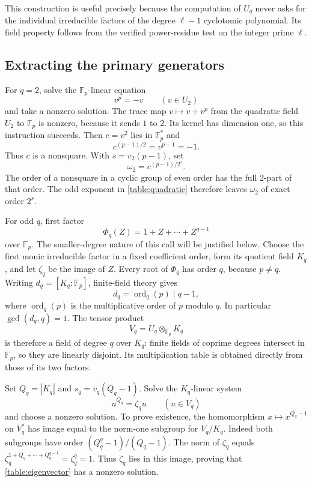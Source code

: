 This construction is useful precisely because the computation of
$U_q$ never asks for the individual irreducible factors of the degree
$\ell-1$ cyclotomic polynomial.  Its field property follows from the
verified power-residue test on the integer prime $\ell$.

\subsection{Extracting the primary generators}

For $q=2$, solve the $\mathbb F_p$-linear equation
\[
 v^p=-v\qquad(v\in U_2)
\]
and take a nonzero solution.  The trace map $v\mapsto v+v^p$ from the
quadratic field $U_2$ to $\mathbb F_p$ is nonzero, because it sends $1$
to $2$.  Its kernel has dimension one, so this instruction succeeds.
Then $c=v^2$ lies in $\mathbb F_p^*$ and
\[
 c^{(p-1)/2}=v^{p-1}=-1.
\]
Thus $c$ is a nonsquare.  With $s=v_2(p-1)$, set
\begin{equation}\label{table:quadratic}
 \omega_2=c^{(p-1)/2^s}.
\end{equation}
The order of a nonsquare in a cyclic group of even order has the full
$2$-part of that order.  The odd exponent in \eqref{table:quadratic}
therefore leaves $\omega_2$ of exact order $2^s$.

For odd $q$, first factor
\[
 \Phi_q(Z)=1+Z+\cdots+Z^{q-1}
\]
over $\mathbb F_p$.  The smaller-degree nature of this call will be
justified below.  Choose the first monic irreducible factor in a fixed
coefficient order, form its quotient field $K_q$, and let $\zeta_q$ be the
image of $Z$.  Every root of $\Phi_q$ has order $q$, because $p\ne q$.
Writing $d_q=[K_q:\mathbb F_p]$, finite-field theory gives
\[
 d_q=\operatorname{ord}_q(p)\mid q-1,
\]
where $\operatorname{ord}_q(p)$ is the multiplicative order of $p$
modulo $q$.  In particular $\gcd(d_q,q)=1$.  The tensor product
\[
 V_q=U_q\otimes_{\mathbb F_p}K_q
\]
is therefore a field of degree $q$ over $K_q$: finite fields of coprime
degrees intersect in $\mathbb F_p$, so they are linearly disjoint.
Its multiplication table is obtained directly from those of its two
factors.

Set $Q_q=|K_q|$ and $s_q=v_q(Q_q-1)$.  Solve the $K_q$-linear system
\begin{equation}\label{table:eigenvector}
 u^{Q_q}=\zeta_q u\qquad(u\in V_q)
\end{equation}
and choose a nonzero solution.  To prove existence, the homomorphism
$x\mapsto x^{Q_q-1}$ on $V_q^*$ has image equal to the norm-one subgroup
for $V_q/K_q$.  Indeed both subgroups have order
$(Q_q^q-1)/(Q_q-1)$.  The norm of $\zeta_q$ equals
$\zeta_q^{1+Q_q+\cdots+Q_q^{q-1}}=\zeta_q^q=1$.
Thus $\zeta_q$ lies in this image, proving that
\eqref{table:eigenvector} has a nonzero solution.

